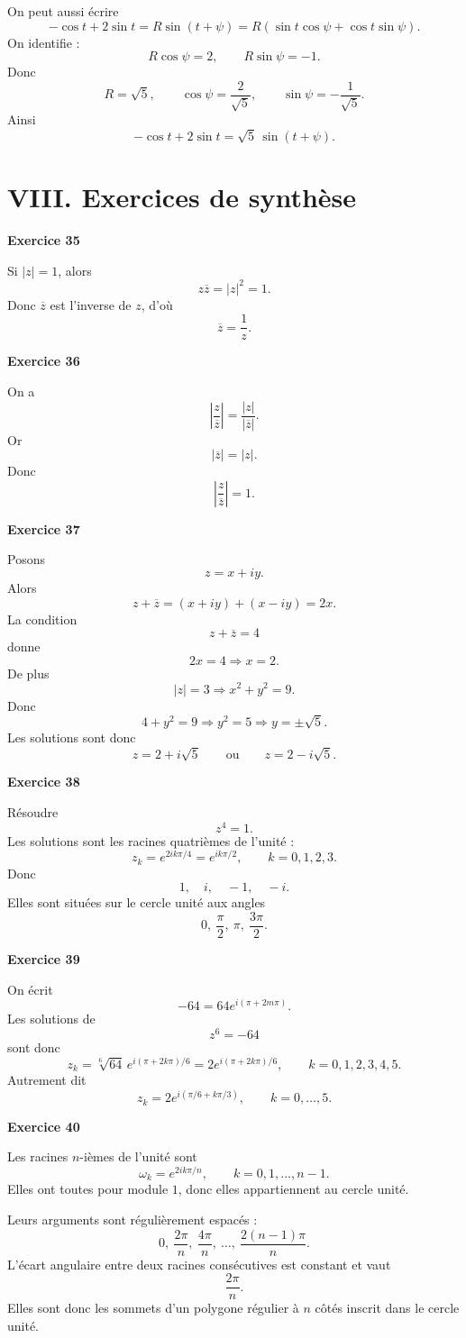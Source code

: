 \documentclass[11pt,a4paper]{article}
\begin{document}
On peut aussi écrire
\[
-\cos t+2\sin t=R\sin(t+\psi)
=R(\sin t\cos\psi+\cos t\sin\psi).
\]
On identifie :
\[
R\cos\psi=2,\qquad R\sin\psi=-1.
\]
Donc
\[
R=\sqrt5,
\qquad
\cos\psi=\frac{2}{\sqrt5},\qquad \sin\psi=-\frac{1}{\sqrt5}.
\]
Ainsi
\[
-\cos t+2\sin t=\sqrt5\,\sin(t+\psi).
\]

\section*{VIII. Exercices de synthèse}

\textbf{Exercice 35}

Si \(|z|=1\), alors
\[
z\overline z=|z|^2=1.
\]
Donc \(\overline z\) est l’inverse de \(z\), d’où
\[
\overline z=\frac{1}{z}.
\]

\textbf{Exercice 36}

On a
\[
\left|\frac{z}{\overline z}\right|=\frac{|z|}{|\overline z|}.
\]
Or
\[
|\overline z|=|z|.
\]
Donc
\[
\left|\frac{z}{\overline z}\right|=1.
\]

\textbf{Exercice 37}

Posons
\[
z=x+iy.
\]
Alors
\[
z+\overline z=(x+iy)+(x-iy)=2x.
\]
La condition
\[
z+\overline z=4
\]
donne
\[
2x=4 \Longrightarrow x=2.
\]
De plus
\[
|z|=3 \Longrightarrow x^2+y^2=9.
\]
Donc
\[
4+y^2=9 \Longrightarrow y^2=5 \Longrightarrow y=\pm \sqrt5.
\]
Les solutions sont donc
\[
z=2+i\sqrt5
\qquad \text{ou} \qquad
z=2-i\sqrt5.
\]

\textbf{Exercice 38}

Résoudre
\[
z^4=1.
\]
Les solutions sont les racines quatrièmes de l’unité :
\[
z_k=e^{2ik\pi/4}=e^{ik\pi/2},\qquad k=0,1,2,3.
\]
Donc
\[
1,\quad i,\quad -1,\quad -i.
\]
Elles sont situées sur le cercle unité aux angles
\[
0,\ \frac{\pi}{2},\ \pi,\ \frac{3\pi}{2}.
\]

\textbf{Exercice 39}

On écrit
\[
-64=64e^{i(\pi+2m\pi)}.
\]
Les solutions de
\[
z^6=-64
\]
sont donc
\[
z_k=\sqrt[6]{64}\,e^{i(\pi+2k\pi)/6}=2e^{i(\pi+2k\pi)/6},
\qquad k=0,1,2,3,4,5.
\]
Autrement dit
\[
z_k=2e^{i(\pi/6+k\pi/3)},\qquad k=0,\dots,5.
\]

\textbf{Exercice 40}

Les racines \(n\)-ièmes de l’unité sont
\[
\omega_k=e^{2ik\pi/n},\qquad k=0,1,\dots,n-1.
\]
Elles ont toutes pour module \(1\), donc elles appartiennent au cercle unité.

Leurs arguments sont régulièrement espacés :
\[
0,\ \frac{2\pi}{n},\ \frac{4\pi}{n},\ \dots,\ \frac{2(n-1)\pi}{n}.
\]
L’écart angulaire entre deux racines consécutives est constant et vaut
\[
\frac{2\pi}{n}.
\]
Elles sont donc les sommets d’un polygone régulier à \(n\) côtés inscrit dans le cercle unité.
\end{document}
